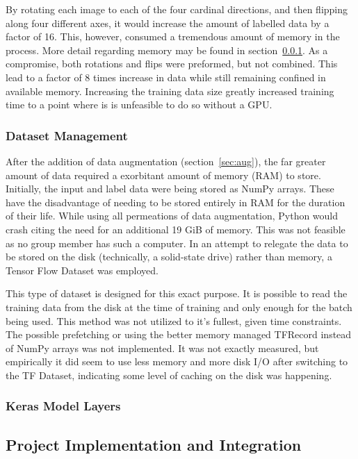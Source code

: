 \documentclass[11pt]{article}
\begin{document}
                By rotating each image to each of the four cardinal directions, and then flipping along four different axes, it would increase the amount of labelled data by a factor of 16. This, however, consumed a tremendous amount of memory in the process. More detail regarding memory may be found in section~\ref{sec:memory}. As a compromise, both rotations and flips were preformed, but not combined. This lead to a factor of 8 times increase in data while still remaining confined in available memory. Increasing the training data size greatly increased training time to a point where is is unfeasible to do so without a GPU.
                
            \subsubsection{Dataset Management}\label{sec:memory}
                After the addition of data augmentation (section~\ref{sec:aug}), the far greater amount of data required a exorbitant amount of memory (RAM) to store. Initially, the input and label data were being stored as NumPy arrays. These have the disadvantage of needing to be stored entirely in RAM for the duration of their life. While using all permeations of data augmentation, Python would crash citing the need for an additional 19 GiB of memory. This was not feasible as no group member has such a computer. In an attempt to relegate the data to be stored on the disk (technically, a solid-state drive) rather than memory, a Tensor Flow Dataset was employed. 

                This type of dataset is designed for this exact purpose. It is possible to read the training data from the disk at the time of training and only enough for the batch being used. This method was not utilized to it's fullest, given time constraints. The possible prefetching or using the better memory managed TFRecord instead of NumPy arrays was not implemented. It was not exactly measured, but empirically it did seem to use less memory and more disk I/O after switching to the TF Dataset, indicating some level of caching on the disk was happening.

            \subsubsection{Keras Model Layers}

        \subsection{Project Implementation and Integration}
\end{document}
